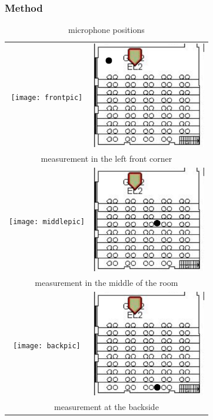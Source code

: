 \documentclass{article}
\begin{document}
\subsubsection{Method}
\begin{table}
\begin{center}
\begin{tabular}{|c c|}
\hline
\texttt{[image: frontpic]} & \includegraphics[width=5cm,keepaspectratio=true]{front}\\
\multicolumn{2}{|c|}{measurement in the left front corner}\\
\hline
\texttt{[image: middlepic]} & \includegraphics[width=5cm,keepaspectratio=true]{middle}\\
\multicolumn{2}{|c|}{measurement in the middle of the room}\\
\hline
\texttt{[image: backpic]} & \includegraphics[width=5cm,keepaspectratio=true]{back}\\
\multicolumn{2}{|c|}{measurement at the backside}\\
\hline
\end{tabular}
\caption{microphone positions}
\label{tab:revmeasure}
\end{center}
\end{table}
\end{document}

